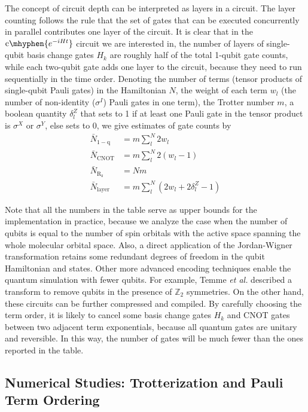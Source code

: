 \documentclass[journal=jctcce,manuscript=article]{achemso}
\newcommand{\controlop}[1]{\mathrm{c}\mhyphen{#1}}
\begin{document}
The concept of circuit depth can be interpreted as layers in a circuit.\cite{rieffel2011quantum}
The layer counting follows the rule that the set of gates that can be executed concurrently in parallel contributes one layer of the circuit.
It is clear that in the $\controlop{e^{-i H t}}$ circuit we are interested in, the number of layers of single-qubit basis change gates $H_k$ are roughly half of the total 1-qubit gate counts, while each two-qubit gate adds one layer to the circuit, because they need to run sequentially in the time order.
Denoting the number of terms (tensor products of single-qubit Pauli gates) in the Hamiltonian $N$, the weight of each term $w_l$ (the number of  non-identity ($\sigma^I$) Pauli gates in one term), the Trotter number $m$, a boolean quantity $\delta_l^Z$ that sets to 1 if at least one Pauli gate in the tensor product is $\sigma^X$ or $\sigma^Y$, else sets to 0, 
we give estimates of gate counts by
\begin{align}
\label{cost_formula}
\bar{N}_\mathrm{1-q}  & =  m \sum_l^N  2 w_l   \\
\bar{N}_\mathrm{CNOT} & =  m \sum_l^N  2 (w_l - 1)  \\
\bar{N}_\mathrm{R_z}  & = N m  \\
\bar{N}_\mathrm{layer}  & = m \sum_l^N  (2 w_l + 2 \delta_l^Z - 1) 
\end{align}

Note that all the numbers in the table serve as upper bounds for the implementation in practice, because we analyze the case when the number of qubits is equal to the number of spin orbitals with the active space spanning the whole molecular orbital space. 
Also, a direct application of the Jordan-Wigner transformation retains some redundant degrees of freedom in the qubit Hamiltonian and states.
Other more advanced encoding techniques enable the quantum simulation with fewer qubits. 
For example, Temme \textit{et al.}\cite{Bravyi:2017wb}  described a transform to remove qubits in the presence of $\mathbb{Z}_{2}$ symmetries.
On the other hand, these circuits can be further compressed and compiled. By carefully choosing the term order, it is likely to cancel some basis change gates $H_k$ and CNOT gates between two adjacent term exponentials, because all quantum gates are unitary and reversible. In this way, the number of gates will be much fewer than the ones reported in the table.

\subsection{Numerical Studies: Trotterization and Pauli Term Ordering}
\end{document}
